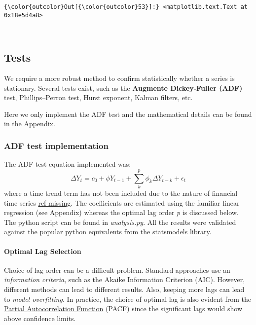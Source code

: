 \documentclass{article}
\begin{document}
            \begin{Verbatim}[commandchars=\\\{\}]
{\color{outcolor}Out[{\color{outcolor}53}]:} <matplotlib.text.Text at 0x18e5d4a8>
\end{Verbatim}
        
    \begin{center}
    \end{center}
    { \hspace*{\fill} \\}
    
    \subsection{Tests}\label{tests}

    We require a more robust method to confirm statistically whether a
series is stationary. Several tests exist, such as the \textbf{Augmente
Dickey-Fuller (ADF)} test, Phillips--Perron test, Hurst exponent, Kalman
filters, etc.

Here we only implement the ADF test and the mathematical details can be
found in the Appendix.

    \subsubsection{ADF test implementation}\label{adf-test-implementation}

The ADF test equation implemented was: \[
\Delta Y_t = c_0 + \phi Y_{t-1} + \sum^p_k \phi_k \Delta Y_{t-k} + \epsilon_t 
\] where a time trend term has not been included due to the nature of
financial time series \href{}{ref missing}. The coefficients are
estimated using the familiar linear regression (see Appendix) whereas
the optimal lag order \emph{p} is discussed below. The python script can
be found in \emph{analysis.py}. All the results were validated against
the popular python equivalents from the
\href{http://statsmodels.sourceforge.net/}{statsmodels library}.

    \paragraph{Optimal Lag Selection}\label{optimal-lag-selection}

Choice of lag order can be a difficult problem. Standard approaches use
an \emph{information criteria}, such as the Akaike Information Criterion
(AIC). However, different methods can lead to different results. Also,
keeping more lags can lead to \emph{model overfitting}. In practice, the
choice of optimal lag is also evident from the
\href{http://nl.mathworks.com/help/econ/autocorrelation-and-partial-autocorrelation.html}{Partial
Autocorrelation Function} (PACF) since the significant lags would show
above confidence limits.
\end{document}
